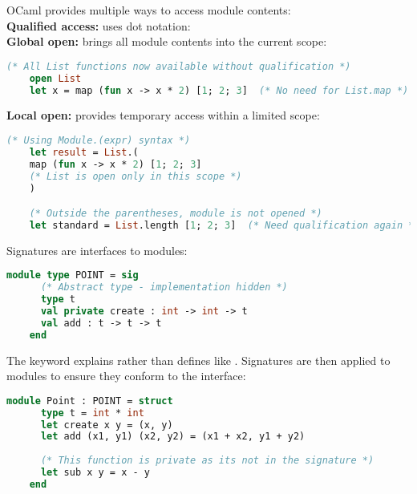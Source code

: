 \newpage 

\begin{Def}
    OCaml provides multiple ways to access module contents:\\

    \noindent
    \textbf{Qualified access:} uses dot notation: \\
        
    \noindent
    \textbf{Global open:} brings all module contents into the current scope:
        \begin{lstlisting}[language=OCaml, numbers=none]
    (* All List functions now available without qualification *)
    open List  
    let x = map (fun x -> x * 2) [1; 2; 3]  (* No need for List.map *)
        \end{lstlisting}
        
    \noindent
    \textbf{Local open:} provides temporary access within a limited scope:
        \begin{lstlisting}[language=OCaml, numbers=none]
    (* Using Module.(expr) syntax *)
    let result = List.(
    map (fun x -> x * 2) [1; 2; 3]  
    (* List is open only in this scope *)
    )

    (* Outside the parentheses, module is not opened *)
    let standard = List.length [1; 2; 3]  (* Need qualification again *)
        \end{lstlisting}
 
\end{Def}

\begin{Def}
    
    Signatures are interfaces to modules:

    \begin{lstlisting}[language=OCaml, numbers=none]
    module type POINT = sig
      (* Abstract type - implementation hidden *)  
      type t              
      val private create : int -> int -> t
      val add : t -> t -> t
    end
    \end{lstlisting}

    \noindent
    The  keyword explains rather than defines like . Signatures are then applied to modules to ensure they conform to the interface:
    
    \begin{lstlisting}[language=OCaml, numbers=none]
    module Point : POINT = struct
      type t = int * int
      let create x y = (x, y)
      let add (x1, y1) (x2, y2) = (x1 + x2, y1 + y2)
      
      (* This function is private as its not in the signature *)
      let sub x y = x - y 
    end
    \end{lstlisting}
\end{Def}

